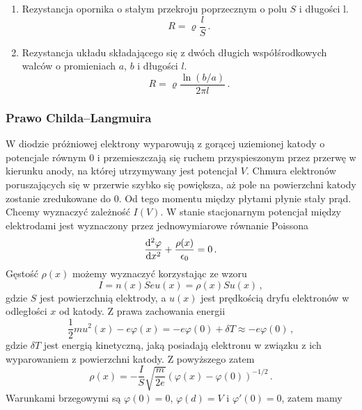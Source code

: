 \documentclass[../main.tex]{subfiles}
\begin{document}
\begin{enumerate}
    \item Rezystancja opornika o stałym przekroju poprzecznym o polu \(S\) i długości l.
    \begin{equation*}
        R=\varrho\frac{l}{S}\,.
    \end{equation*}
    
    \item Rezystancja układu składającego się z dwóch długich współśrodkowych walców o promieniach \(a\), \(b\) i długości \(l\).
    \begin{equation*}
        R=\varrho\frac{\ln(b/a)}{2\pi l}\,.
    \end{equation*}

\end{enumerate}
\subsubsection{Prawo Childa--Langmuira}
W diodzie próżniowej elektrony wyparowują z gorącej uziemionej katody o potencjale równym 0 i przemieszczają się ruchem przyspieszonym przez przerwę w kierunku anody, na której utrzymywany jest potencjał \(V\). Chmura elektronów poruszających się w przerwie szybko się powiększa, aż pole na powierzchni katody zostanie zredukowane do 0. Od tego momentu między płytami płynie stały prąd. Chcemy wyznaczyć zależność \(I(V)\). W stanie stacjonarnym potencjał między elektrodami jest wyznaczony przez jednowymiarowe równanie Poissona
\begin{equation*}
    \dv[2]{\varphi}{x}+\frac{\rho(x)}{\epsilon_0}=0\,.
\end{equation*}
Gęstość \(\rho(x)\) możemy wyznaczyć korzystając ze wzoru
\begin{equation*}
    I=n(x)Seu(x)=\rho(x)Su(x)\,,
\end{equation*}
gdzie \(S\) jest powierzchnią elektrody, a \(u(x)\) jest prędkością dryfu elektronów w odległości \(x\) od katody. Z prawa zachowania energii
\begin{equation*}
    \frac{1}{2}mu^2(x)-e\varphi(x)=-e\varphi(0)+\delta T\approx-e\varphi(0)\,,
\end{equation*}
gdzie \(\delta T\) jest energią kinetyczną, jaką posiadają elektronu w związku z ich wyparowaniem z powierzchni katody. Z powyższego zatem
\begin{equation*}
    \rho(x)=-\frac{I}{S}\sqrt{\frac{m}{2e}}(\varphi(x)-\varphi(0))^{-1/2}\,.
\end{equation*}
Warunkami brzegowymi są \(\varphi(0)=0\), \(\varphi(d)=V\) i \(\varphi'(0)=0\), zatem mamy
\end{document}
